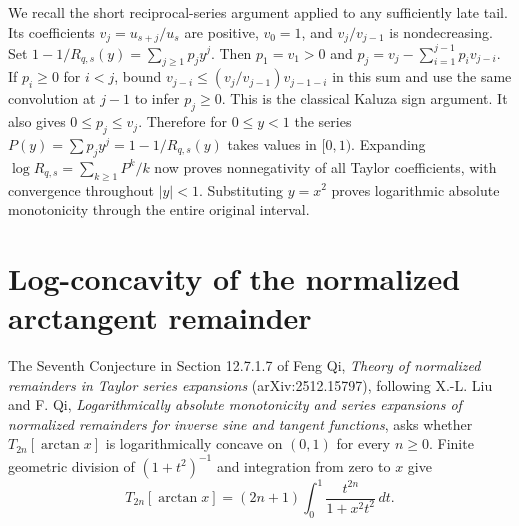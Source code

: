\documentclass[11pt,a4paper]{article}
\numberwithin{equation}{section}
\begin{document}
We recall the short reciprocal-series argument applied to any
sufficiently late tail. Its coefficients $v_j=u_{s+j}/u_s$ are
positive, $v_0=1$, and $v_j/v_{j-1}$ is nondecreasing. Set
$1-1/R_{q,s}(y)=\sum_{j\ge1}p_j y^j$. Then $p_1=v_1>0$ and
$p_j=v_j-\sum_{i=1}^{j-1}p_i v_{j-i}$. If $p_i\ge0$ for $i<j$,
bound $v_{j-i}\le(v_j/v_{j-1})v_{j-1-i}$ in this sum and use the
same convolution at $j-1$ to infer $p_j\ge0$. This is the classical
Kaluza sign argument. It also gives $0\le p_j\le v_j$. Therefore
for $0\le y<1$ the series $P(y)=\sum p_jy^j=1-1/R_{q,s}(y)$ takes
values in $[0,1)$. Expanding $\log R_{q,s}=\sum_{k\ge1}P^k/k$
now proves nonnegativity of all Taylor coefficients, with convergence
throughout $|y|<1$. Substituting $y=x^2$ proves logarithmic absolute
monotonicity through the entire original interval.


\section{Log-concavity of the normalized arctangent remainder}
\label{sec:qi-seventh}

The Seventh Conjecture in Section 12.7.1.7 of Feng Qi,
\emph{Theory of normalized remainders in Taylor series expansions}
(arXiv:2512.15797), following X.-L. Liu and F. Qi,
\emph{Logarithmically absolute monotonicity and series expansions of
normalized remainders for inverse sine and tangent functions}, asks
whether $T_{2n}[\arctan x]$ is logarithmically concave on $(0,1)$
for every $n\ge0$. Finite geometric division of $(1+t^2)^{-1}$ and
integration from zero to $x$ give
\[
 T_{2n}[\arctan x]=(2n+1)\int_0^1 \frac{t^{2n}}{1+x^2t^2}\,dt .
\]
\end{document}
